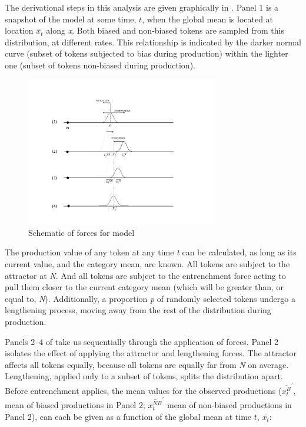 The derivational steps in this analysis are given graphically in .
Panel 1 is a snapshot of the model at some
time, \emph{$t$}, when the global mean is located at location $\overline{x_{t}}$
along \emph{x}. Both biased and non-biased tokens are sampled from
this distribution, at different rates. This relationship is indicated
by the darker normal curve (subset of tokens subjected to bias during
production) within the lighter one (subset of tokens non-biased during
production). 

\begin{figure}[h]
\includegraphics[width=0.75\textwidth]{figures/Model1Behavior.pdf}\caption{\label{fig:Derivation}Schematic of forces for  model}
\end{figure}

The production value of any token at any time \emph{t} can be calculated,
as long as its current value, and the category mean, are known. All
tokens are subject to the attractor at \emph{N}. And all tokens are
subject to the entrenchment force acting to pull them closer to the
current category mean (which will be greater than, or equal to, \emph{N}).
Additionally, a proportion \emph{p} of randomly selected tokens undergo
a lengthening process, moving away from the rest of the distribution
during production.

Panels 2--4 of  take us sequentially through
the application of forces. Panel 2 isolates the effect of applying
the attractor and lengthening forces. The attractor affects all tokens
equally, because all tokens are equally far from \emph{N} on average.
Lengthening, applied only to a subset of tokens, splits the distribution
apart. Before entrenchment applies, the mean values for the observed
productions ($\overline{x_{t}^{B}}^{\prime}$, mean of biased productions
in Panel 2; $\overline{x_{t}^{NB}}^{\prime}$ mean of non-biased productions
in Panel 2), can each be given as a function of the global mean at
time $t$, $\bar{x_{t}}$:

